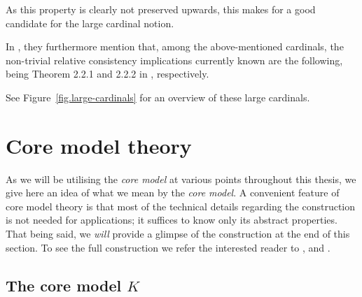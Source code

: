 \documentclass[../../main]{subfiles}
\begin{document}

As this property is clearly not preserved upwards, this makes for a good candidate for the large cardinal notion.


In \cite{Cutolo}, they furthermore mention that, among the above-mentioned cardinals, the non-trivial relative consistency implications currently known are the following, being Theorem 2.2.1 and 2.2.2 in \cite{Cutolo}, respectively.



See Figure~\ref{fig.large-cardinals} for an overview of these large cardinals.


\section{Core model theory}
\label{prelims.core-model-theory}


As we will be utilising the \textit{core model} at various points throughout this thesis, we give here an idea of what we mean by the \textit{core model}. A convenient feature of core model theory is that most of the technical details regarding the construction is not needed for applications; it suffices to know only its abstract properties. That being said, we \textit{will} provide a glimpse of the construction at the end of this section. To see the full construction we refer the interested reader to \cite{MSc}, \cite{Zeman} and \cite{Kwithoutmeasurable}. 


\subsection{The core model $K$}
\end{document}
